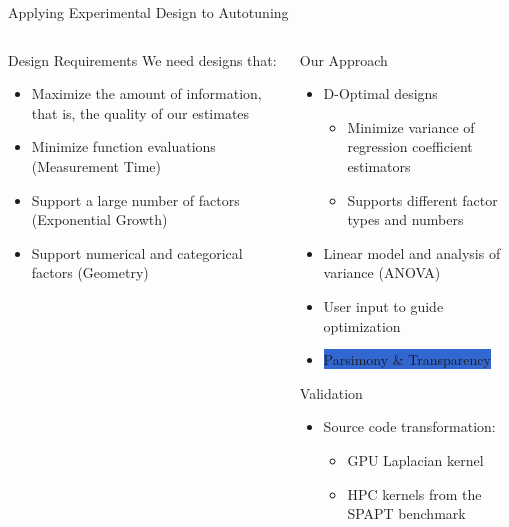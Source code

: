 \documentclass[10pt, compress, aspectratio=169, xcolor={table,usenames,dvipsnames}]{beamer}
\begin{document}
\begin{frame}[label={sec:org1b55223}]{Applying Experimental Design to Autotuning}
\begin{columns}
\begin{column}{0.45\columnwidth}
\begin{block}{Design Requirements}
\vspace{.7em}
We need designs that:

\begin{itemize}
\item Maximize the amount of \alert{information}, that is, the quality of our estimates
\item Minimize function evaluations (\alert{Measurement Time})
\item Support a large number of factors (\alert{Exponential Growth})
\item Support numerical and categorical factors (\alert{Geometry})
\end{itemize}
\end{block}
\end{column}

\begin{column}{0.55\columnwidth}
\begin{block}{Our Approach}
\begin{itemize}
\item \alert{D-Optimal  designs}
\begin{itemize}
\item Minimize variance of regression coefficient estimators
\item Supports different factor types and numbers
\end{itemize}
\item Linear model and analysis of variance (ANOVA)
\item User input to guide optimization
\item \colorbox{Highlight}{\alert{Parsimony} \& \alert{Transparency}}
\end{itemize}

\begin{block}{Validation}
\begin{itemize}
\item Source code transformation:
\begin{itemize}
\item GPU Laplacian kernel
\item HPC kernels from the SPAPT benchmark
\end{itemize}
\end{itemize}
\end{block}
\end{block}
\end{column}
\end{columns}
\end{frame}
\end{document}
